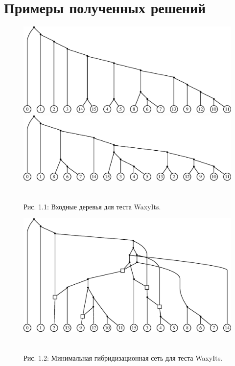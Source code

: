 
\FloatBarrier
\chapter{Примеры полученных решений} \label{AppendixA}

\begin{figure}[h!]
  \includegraphics[width=\linewidth]{img/Grass2WaxyIts_tree0.eps}
  \includegraphics[width=\linewidth]{img/Grass2WaxyIts_tree1.eps}
  \\\\\\
  \centering
  Рис. 1.1: Входные деревья для теста WaxyIts.
\end{figure}

\begin{figure}[h]
  \includegraphics[width=\linewidth]{img/Grass2WaxyIts.eps}
  \\\\\\
  \centering
  Рис. 1.2: Минимальная гибридизационная сеть для теста WaxyIts.
\end{figure}

